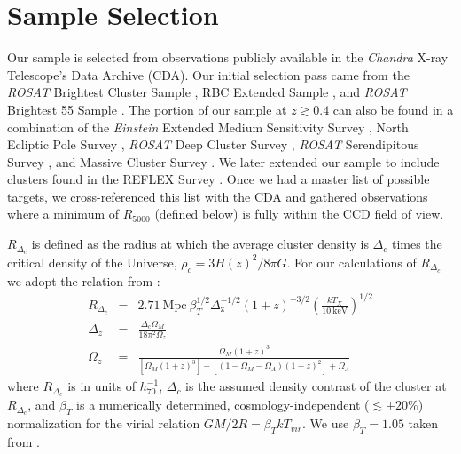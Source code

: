 \documentclass{emulateapj}
\begin{document}
\section{Sample Selection} \label{sec:selection}

Our sample is selected from observations publicly available in the
{\it Chandra} X-ray Telescope's Data Archive (CDA). Our initial
selection pass came from the {\textit{ROSAT}} Brightest Cluster Sample
\citep{1998MNRAS.301..881E}, RBC Extended Sample
\citep{2000MNRAS.318..333E}, and {\textit{ROSAT}} Brightest 55 Sample
\citep{1990MNRAS.245..559E, 1998MNRAS.298..416P}. The portion of our
sample at $z \gtrsim 0.4$ can also be found in a combination of the
{\textit{Einstein}} Extended Medium Sensitivity Survey
\citep{1990ApJS...72..567G}, North Ecliptic Pole Survey
\citep{2006ApJS..162..304H}, {\textit{ROSAT}} Deep Cluster Survey
\citep{1995ApJ...445L..11R}, {\textit{ROSAT}} Serendipitous Survey
\citep{1998ApJ...502..558V}, and Massive Cluster Survey
\citep{2001ApJ...553..668E}. We later extended our sample to include
clusters found in the REFLEX Survey \citep{2004A&A...425..367B}. Once
we had a master list of possible targets, we cross-referenced this
list with the CDA and gathered observations where a minimum of
$R_{5000}$ (defined below) is fully within the CCD field of
view.

$R_{\Delta_c}$ is defined as the radius at which the average cluster
density is $\Delta_c$ times the critical density of the Universe,
$\rho_c=3H(z)^2/8\pi G$. For our calculations of $R_{\Delta_c}$ we
adopt the relation from \cite{2002A&A...389....1A}:
\begin{eqnarray}
R_{\Delta_c} &=& 2.71 \mathrm{~Mpc~}
\beta_T^{1/2}
\Delta_{\mathrm{z}}^{-1/2}
(1+z)^{-3/2}
\left(\frac{kT_X}{10 \mathrm{~keV}}\right)^{1/2}\\
\Delta_z &=& \frac{\Delta_c \Omega_M}{18\pi^2\Omega_z} \nonumber \\
\Omega_z &=& \frac{\Omega_M (1+z)^3}{[\Omega_M
(1+z)^3]+[(1-\Omega_M-\Omega_{\Lambda})(1+z)^2]+\Omega_{\Lambda}} \nonumber
\end{eqnarray}
where $R_{\Delta_c}$ is in units of $h_{70}^{-1}$, $\Delta_c$ is
the assumed density contrast of the cluster at $R_{\Delta_c}$, and
$\beta_T$ is a numerically determined, cosmology-independent
($\lesssim \pm 20\%$) normalization for the virial relation $GM/2R =
\beta_TkT_{vir}$. We use $\beta_T = 1.05$ taken from
\cite{1996ApJ...469..494E}.
\end{document}
